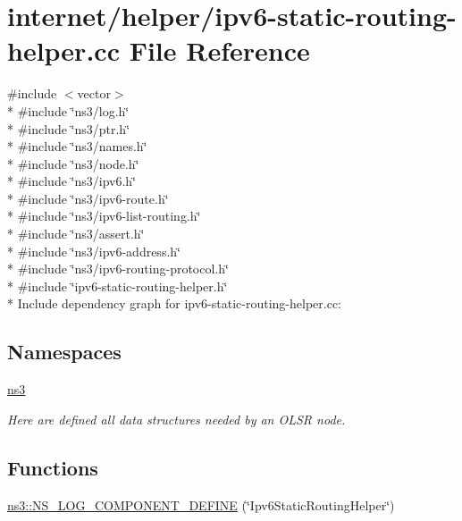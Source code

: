\hypertarget{ipv6-static-routing-helper_8cc}{}\section{internet/helper/ipv6-\/static-\/routing-\/helper.cc File Reference}
\label{ipv6-static-routing-helper_8cc}
{\ttfamily \#include $<$vector$>$}\\*
{\ttfamily \#include \char`\"{}ns3/log.\+h\char`\"{}}\\*
{\ttfamily \#include \char`\"{}ns3/ptr.\+h\char`\"{}}\\*
{\ttfamily \#include \char`\"{}ns3/names.\+h\char`\"{}}\\*
{\ttfamily \#include \char`\"{}ns3/node.\+h\char`\"{}}\\*
{\ttfamily \#include \char`\"{}ns3/ipv6.\+h\char`\"{}}\\*
{\ttfamily \#include \char`\"{}ns3/ipv6-\/route.\+h\char`\"{}}\\*
{\ttfamily \#include \char`\"{}ns3/ipv6-\/list-\/routing.\+h\char`\"{}}\\*
{\ttfamily \#include \char`\"{}ns3/assert.\+h\char`\"{}}\\*
{\ttfamily \#include \char`\"{}ns3/ipv6-\/address.\+h\char`\"{}}\\*
{\ttfamily \#include \char`\"{}ns3/ipv6-\/routing-\/protocol.\+h\char`\"{}}\\*
{\ttfamily \#include \char`\"{}ipv6-\/static-\/routing-\/helper.\+h\char`\"{}}\\*
Include dependency graph for ipv6-\/static-\/routing-\/helper.cc\+:
\subsection*{Namespaces}
\begin{DoxyCompactItemize}
\item 
 \hyperlink{namespacens3}{ns3}
\begin{DoxyCompactList}\small\item\em Here are defined all data structures needed by an O\+L\+SR node. \end{DoxyCompactList}\end{DoxyCompactItemize}
\subsection*{Functions}
\begin{DoxyCompactItemize}
\item 
\hyperlink{namespacens3_afc25f4793f7cd300f74290d240e7691b}{ns3\+::\+N\+S\+\_\+\+L\+O\+G\+\_\+\+C\+O\+M\+P\+O\+N\+E\+N\+T\+\_\+\+D\+E\+F\+I\+NE} (\char`\"{}Ipv6\+Static\+Routing\+Helper\char`\"{})
\end{DoxyCompactItemize}
